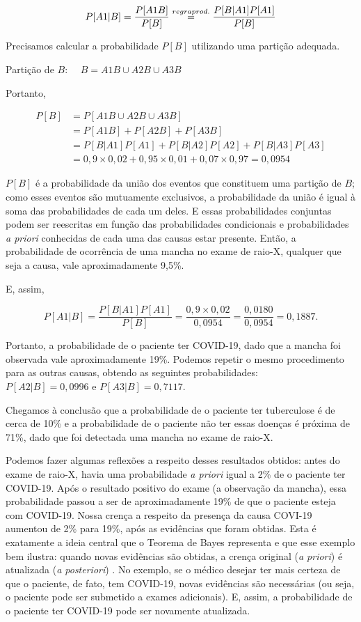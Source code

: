 \documentclass[
]{book}
\theoremstyle{definition}
\theoremstyle{definition}
\theoremstyle{definition}
\theoremstyle{remark}
\begin{document}
\[P[A1|B] = \frac{P[A1B]}{P[B]} \stackrel{regra\\ prod.}{=}\frac{P[B|A1] P[A1]}{P[B]}\]

Precisamos calcular a probabilidade \(P[B]\) utilizando uma partição adequada.

Partição de \(B\): \(\quad B = A1B \cup A2B \cup A3B\)

Portanto,

\begin{align*}
P[B] 
&= P[A1B ∪ A2B ∪ A3B]\\
&= P[A1B] + P[A2B] + P[A3B]\\
&= P[B|A1] P[A1] + P[B|A2] P[A2] + P[B|A3] P[A3]\\
&= 0,9 \times 0,02 + 0,95 \times 0,01 + 0,07 \times 0,97 = 0,0954
\end{align*}

\(P[B]\) é a probabilidade da união dos eventos que constituem uma partição de \(B\); como esses eventos são mutuamente exclusivos, a probabilidade da união é igual à soma das probabilidades de cada um deles. E essas probabilidades conjuntas podem ser reescritas em função das probabilidades condicionais e probabilidades \emph{a priori} conhecidas de cada uma das causas estar presente. Então, a probabilidade de ocorrência de uma mancha no exame de raio-X, qualquer que seja a causa, vale aproximadamente 9,5\%.

E, assim,

\[P[A1|B] = \frac{P[B|A1]P[A1]}{P[B]}=\frac{0,9 \times 0,02}{0,0954} = \frac{0,0180}{0,0954} = 0,1887.\]

Portanto, a probabilidade de o paciente ter COVID-19, dado que a mancha foi observada vale aproximadamente 19\%. Podemos repetir o mesmo procedimento para as outras causas, obtendo as seguintes probabilidades:\\
\(P[A2|B] = 0,0996\) e \(P[A3|B] = 0,7117\).

Chegamos à conclusão que a probabilidade de o paciente ter tuberculose é de cerca de 10\% e a probabilidade de o paciente não ter essas doenças é próxima de 71\%, dado que foi detectada uma mancha no exame de raio-X.

Podemos fazer algumas reflexões a respeito desses resultados obtidos: antes do exame de raio-X, havia uma probabilidade \emph{a priori} igual a 2\% de o paciente ter COVID-19. Após o resultado positivo do exame (a observação da mancha), essa probabilidade passou a ser de aproximadamente 19\% de que o paciente esteja com COVID-19. Nossa crença a respeito da presença da causa COVI-19 aumentou de 2\% para 19\%, após as evidências que foram obtidas. Esta é exatamente a ideia central que o Teorema de Bayes representa e que esse exemplo bem ilustra: quando novas evidências são obtidas, a crença original (\emph{a priori}) é atualizada (\emph{a posteriori}) . No exemplo, se o médico desejar ter mais certeza de que o paciente, de fato, tem COVID-19, novas evidências são necessárias (ou seja, o paciente pode ser submetido a exames adicionais). E, assim, a probabilidade de o paciente ter COVID-19 pode ser novamente atualizada.
\end{document}
